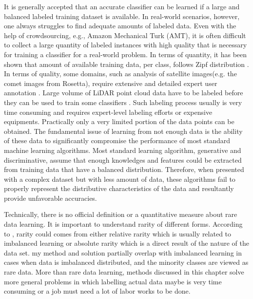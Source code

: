 \documentclass{iitthesis}
\begin{document}
 \label{chapter: data space}

 \label{dataspace: introduction}

It is generally accepted that an accurate classifier can be learned if a large and balanced labeled training dataset is available. In real-world scenarios, however, one always struggles to find adequate amounts of labeled data. Even with the help of crowdsourcing, e.g., Amazon Mechanical Turk (AMT), it is often difficult to collect a large quantity of labeled instances with high quality that is necessary for training a classifier for a real-world problem. In terms of quantity, it has been shown that amount of available training data, per class, follows Zipf distribution \cite{torralba2011app_share}. In terms of quality, some domains, such as analysis of satellite images(e.g. the comet images from Rosetta), require extensive and detailed expert user annotation \cite{remotesensing2013}. Large volume of LiDAR point cloud data have to be labeled before they can be used to train some classifiers \cite{ZX:14}. Such labeling process usually is very time consuming and requires expert-level labeling efforts or expensive equipments. Practically only a very limited portion of the data points can be obtained. The fundamental issue of learning from not enough data is the ability of these data to significantly compromise the performance of most standard machine learning algorithms. Most standard learning algorithm, generative and discriminative, assume that enough knowledges and features could be extracted from training data that have a balanced distribution. Therefore, when presented with a complex dataset but with less amount of data, these algorithms fail to properly represent the distributive characteristics of the data and resultantly provide unfavorable accuracies.

Technically, there is no official definition or a quantitative measure about rare data learning. It is important to understand rarity of different forms. According to \cite{Weiss}, rarity could comes from either relative rarity which is usually related to imbalanced learning or absolute rarity which is a direct result of the nature of the data set. my method and solution partially overlap with imbalanced learning in cases when data is imbalanced distributed, and the minority classes are viewed as rare data. More than rare data learning, methods discussed in this chapter solve more general problems in which labelling actual data maybe is very time consuming or a job must need a lot of labor works to be done. 
\end{document}
